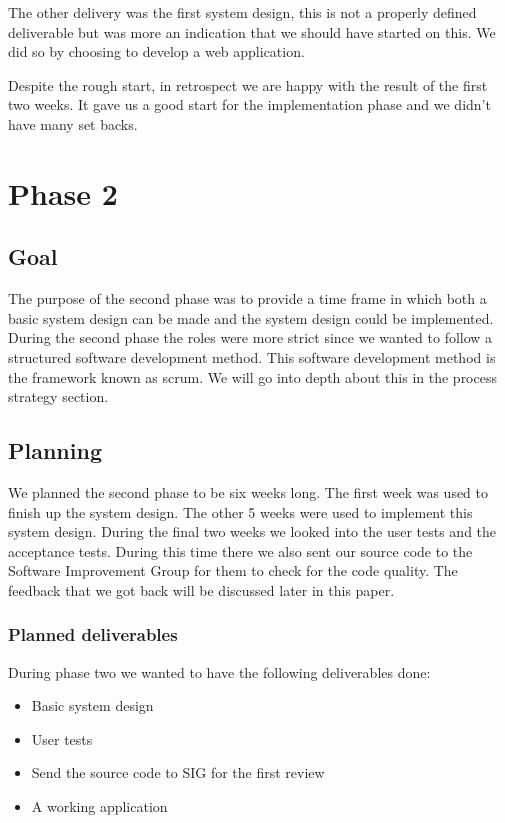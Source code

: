 The other delivery was the first system design, this is not a properly defined deliverable but was more an indication that we should have started on this.
We did so by choosing to develop a web application.

Despite the rough start, in retrospect we are happy with the result of the first two weeks.
It gave us a good start for the implementation phase and we didn't have many set backs.

\section{Phase 2}
\subsection{Goal}
The purpose of the second phase was to provide a time frame in which both a basic system design can be made and the system design could be implemented.
During the second phase the roles were more strict since we wanted to follow a structured software development method.
This software development method is the framework known as scrum.
We will go into depth about this in the process strategy section.

\subsection{Planning}
We planned the second phase to be six weeks long.
The first week was used to finish up the system design.
The other 5 weeks were used to implement this system design.
During the final two weeks we looked into the user tests and the acceptance tests.
During this time there we also sent our source code to the Software Improvement Group for them to check for the code quality.
The feedback that we got back will be discussed later in this paper.

\subsubsection{Planned deliverables}
During phase two we wanted to have the following deliverables done:
\begin{itemize}
\item Basic system design
\item User tests
\item Send the source code to SIG for the first review
\item A working application
\end{itemize}

